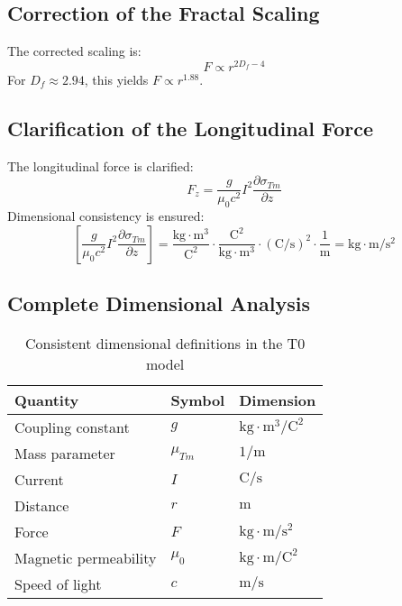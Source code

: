 \documentclass[10pt, a4paper]{article}
\begin{document}
	\subsection{Correction of the Fractal Scaling}
	The corrected scaling is:
	\begin{equation}
		F \propto r^{2D_f - 4} \label{eq:fractal_scaling_final}
	\end{equation}
	For $D_f \approx 2.94$, this yields $F \propto r^{1.88}$.
	
	\subsection{Clarification of the Longitudinal Force}
	The longitudinal force is clarified:
	\begin{equation}
		F_z = \frac{g}{\mu_0 c^2} I^2 \frac{\partial \sigma_{Tm}}{\partial z} \label{eq:long_force_final}
	\end{equation}
	Dimensional consistency is ensured:
	\begin{equation}
		\left[\frac{g}{\mu_0 c^2} I^2 \frac{\partial \sigma_{Tm}}{\partial z}\right] = \frac{\text{kg} \cdot \text{m}^3}{\text{C}^2} \cdot \frac{\text{C}^2}{\text{kg} \cdot \text{m}^3} \cdot (\text{C}/\text{s})^2 \cdot \frac{1}{\text{m}} = \text{kg} \cdot \text{m}/\text{s}^2
	\end{equation}
	
	\subsection{Complete Dimensional Analysis}
	\begin{table}[h]
		\centering
		\begin{tabular}{lll}
			\hline
			Quantity & Symbol & Dimension \\
			\hline
			Coupling constant & $g$ & $\text{kg} \cdot \text{m}^3/\text{C}^2$ \\
			Mass parameter & $\mu_{Tm}$ & $1/\text{m}$ \\
			Current & $I$ & $\text{C}/\text{s}$ \\
			Distance & $r$ & $\text{m}$ \\
			Force & $F$ & $\text{kg} \cdot \text{m}/\text{s}^2$ \\
			Magnetic permeability & $\mu_0$ & $\text{kg} \cdot \text{m}/\text{C}^2$ \\
			Speed of light & $c$ & $\text{m}/\text{s}$ \\
			\hline
		\end{tabular}
		\caption{Consistent dimensional definitions in the T0 model}
		\label{tab:dimensions}
	\end{table}
	
\end{document}
